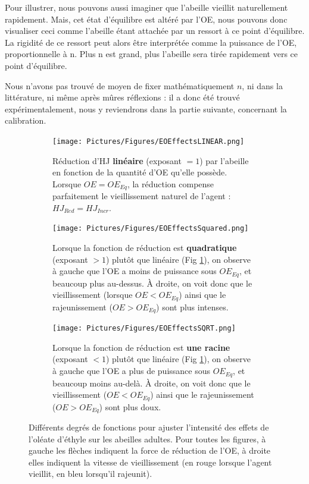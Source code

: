 	Pour illustrer, nous pouvons aussi imaginer que l'abeille vieillit naturellement rapidement. Mais, cet état d'équilibre est altéré par l'OE, nous pouvons donc visualiser ceci comme l'abeille étant attachée par un ressort à ce point d'équilibre. La rigidité de ce ressort peut alors être interprétée comme la puissance de l'OE, proportionnelle à n. Plus n est grand, plus l'abeille sera tirée rapidement vers ce point d'équilibre.
	
	Nous n'avons pas trouvé de moyen de fixer mathématiquement $n$, ni dans la littérature, ni même après mûres réflexions : il a donc été trouvé expérimentalement, nous y reviendrons dans la partie suivante, concernant la calibration.
	
	\begin{figure}
	\centering
	
	\begin{subfigure}{\textwidth}
	\centering
	\texttt{[image: Pictures/Figures/EOEffectsLINEAR.png]}
	\caption{Réduction d'HJ \textbf{linéaire} (exposant $= 1$) par l'abeille en fonction de la quantité d'OE qu'elle possède. Lorsque $OE = OE_{Eq}$, la réduction compense parfaitement le vieillissement naturel de l'agent : $HJ_{Red} = HJ_{Incr}$.}
	\label{eoLinear}
	\end{subfigure}
	
	\begin{subfigure}{\textwidth}
	\centering
	\texttt{[image: Pictures/Figures/EOEffectsSquared.png]}
	\caption{Lorsque la fonction de réduction est \textbf{quadratique} (exposant $> 1$) plutôt que linéaire (Fig \ref{eoLinear}), on observe à gauche que l'OE a moins de puissance sous $OE_{Eq}$, et beaucoup plus au-dessus. À droite, on voit donc que le vieillissement (lorsque $OE < OE_{Eq}$) ainsi que le rajeunissement ($OE > OE_{Eq}$) sont plus intenses.}
	\label{eoSquared}
	\end{subfigure}
	
	\begin{subfigure}{\textwidth}
	\centering
	\texttt{[image: Pictures/Figures/EOEffectsSQRT.png]}
	\caption{Lorsque la fonction de réduction est \textbf{une racine} (exposant $< 1$) plutôt que linéaire (Fig \ref{eoLinear}), on observe à gauche que l'OE a plus de puissance sous $OE_{Eq}$, et beaucoup moins au-delà. À droite, on voit donc que le vieillissement ($OE < OE_{Eq}$) ainsi que le rajeunissement ($OE > OE_{Eq}$) sont plus doux.}
	\label{eoSqrt}	
	\end{subfigure}
	
	\caption[Différents degrés de fonctions pour ajuster l'intensité des effets de l'oléate d'éthyle sur les abeilles adultes.]{Différents degrés de fonctions pour ajuster l'intensité des effets de l'oléate d'éthyle sur les abeilles adultes. Pour toutes les figures, à gauche les flèches indiquent la force de réduction de l'OE, à droite elles indiquent la vitesse de vieillissement (en rouge lorsque l'agent vieillit, en bleu lorsqu'il rajeunit).}	
	\label{eoAll}
	\end{figure}
	
